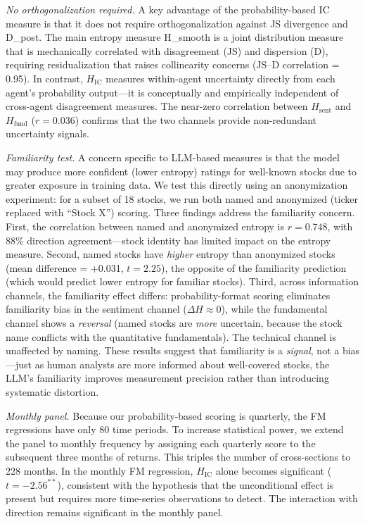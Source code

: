 \documentclass[12pt,a4paper]{article}
\begin{document}
\textit{No orthogonalization required.} A key advantage of the probability-based IC measure is that it does not require orthogonalization against JS divergence and D\_post. The main entropy measure H\_smooth is a joint distribution measure that is mechanically correlated with disagreement (JS) and dispersion (D), requiring residualization that raises collinearity concerns (JS--D correlation = 0.95). In contrast, $H_{\text{IC}}$ measures within-agent uncertainty directly from each agent's probability output---it is conceptually and empirically independent of cross-agent disagreement measures. The near-zero correlation between $H_{\text{sent}}$ and $H_{\text{fund}}$ ($r = 0.036$) confirms that the two channels provide non-redundant uncertainty signals.

\textit{Familiarity test.} A concern specific to LLM-based measures is that the model may produce more confident (lower entropy) ratings for well-known stocks due to greater exposure in training data. We test this directly using an anonymization experiment: for a subset of 18 stocks, we run both named and anonymized (ticker replaced with ``Stock X'') scoring. Three findings address the familiarity concern. First, the correlation between named and anonymized entropy is $r = 0.748$, with 88\% direction agreement---stock identity has limited impact on the entropy measure. Second, named stocks have \textit{higher} entropy than anonymized stocks (mean difference = +0.031, $t = 2.25$), the opposite of the familiarity prediction (which would predict lower entropy for familiar stocks). Third, across information channels, the familiarity effect differs: probability-format scoring eliminates familiarity bias in the sentiment channel ($\Delta H \approx 0$), while the fundamental channel shows a \textit{reversal} (named stocks are \textit{more} uncertain, because the stock name conflicts with the quantitative fundamentals). The technical channel is unaffected by naming. These results suggest that familiarity is a \textit{signal}, not a bias---just as human analysts are more informed about well-covered stocks, the LLM's familiarity improves measurement precision rather than introducing systematic distortion.

\textit{Monthly panel.} Because our probability-based scoring is quarterly, the FM regressions have only 80 time periods. To increase statistical power, we extend the panel to monthly frequency by assigning each quarterly score to the subsequent three months of returns. This triples the number of cross-sections to 228 months. In the monthly FM regression, $H_{\text{IC}}$ alone becomes significant ($t = -2.56^{**}$), consistent with the hypothesis that the unconditional effect is present but requires more time-series observations to detect. The interaction with direction remains significant in the monthly panel.
\end{document}
